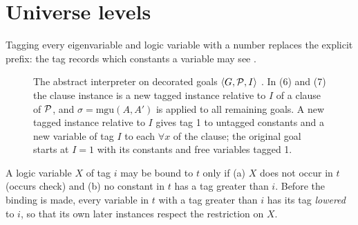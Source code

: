\section{Universe levels}\label{sec:rules-levels}

Tagging every eigenvariable and logic variable with a number replaces the explicit prefix: the tag records which constants a variable may see \cite[p.\,15--18]{NadathurJayaramanKwon1995}.

\begin{figure}[htbp]
\small
{}
\caption{The abstract interpreter on decorated goals $\langle G,\mathcal{P},I\rangle$ \cite[p.\,17--18]{NadathurJayaramanKwon1995}. In (6) and (7) the clause instance is a new tagged instance relative to $I$ of a clause of $\mathcal{P}$, and $\sigma=\mathrm{mgu}(A,A')$ is applied to all remaining goals. A new tagged instance relative to $I$ gives tag 1 to untagged constants and a new variable of tag $I$ to each $\forall x$ of the clause; the original goal starts at $I=1$ with its constants and free variables tagged 1.}\label{fig:rules-ui}
\end{figure}

\begin{definition}\label{def:rules-binding}
A logic variable $X$ of tag $i$ may be bound to $t$ only if (a) $X$ does not occur in $t$ (occurs check) and (b) no constant in $t$ has a tag greater than $i$.
Before the binding is made, every variable in $t$ with a tag greater than $i$ has its tag \emph{lowered} to $i$, so that its own later instances respect the restriction on $X$.
\end{definition}

